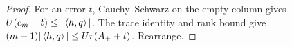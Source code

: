 \begin{proof}
For an error $t$, Cauchy--Schwarz on the empty column gives $U(c_m-t)\le|\left\langle h,q\right\rangle|$. The trace identity and rank bound give $(m+1)|\left\langle h,q\right\rangle|\le Ur(A_++t)$. Rearrange.
\end{proof}
